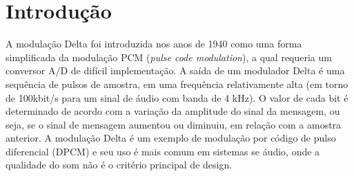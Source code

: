 \newpage
\section{Introdução}
A modulação Delta foi introduzida nos anos de 1940 como uma forma simplificada da modulação PCM (\textit{pulse code modulation}), a qual requeria um conversor A/D de difícil implementação. A saída de um modulador Delta é uma sequência de pulsos de amostra, em uma frequência relativamente alta (em torno de 100kbit/s para um sinal de áudio com banda de 4 kHz). O valor de cada bit é determinado de acordo com a variação da amplitude do sinal da mensagem, ou seja, se o sinal de mensagem aumentou ou diminuiu, em relação com a amostra anterior. A modulação Delta é um exemplo de modulação por código de pulso diferencial (DPCM) e seu uso é mais comum em sistemas se áudio, onde a qualidade do som não é o critério principal de design.
